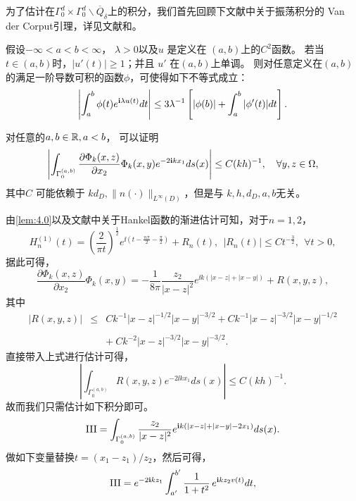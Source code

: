 \finproof
为了估计在$\Gamma_0^d\times \Gamma_0^d\backslash \overline Q_\delta$上的积分，我们首先回顾下文献中关于振荡积分的
Van der Corput引理，详见文献\cite[P.152]{grafakos}和\cite[Lemma 3.2]{ch_ha}。
\begin{lemma}\label{lem:4.2}
假设$-\infty<a<b<\infty$， $\lambda>0$以及$u$ 是定义在 $(a,b)$上的$C^2$函数。 若当 $t\in (a,b)$时，$|u'(t)|\geq 1$；并且
$u'$ 在$(a,b)$上单调。 则对任意定义在$(a,b)$的满足一阶导数可积的函数$\phi$，可使得如下不等式成立：
\begin{equation*}
\left|\int^b_a \phi(t)e^{\mathbf{i}\lambda u(t)}dt\right|\leq 3\lambda^{-1}\left[|\phi(b)|+\int^b_a|\phi'(t)|dt\right].
\end{equation*}
\end{lemma}
\begin{lemma}\label{lem:4.5}
对任意的$a,b\in\mathbb{R}, a<b$， 可以证明
$$
    \left|\int_{\Gamma_0^{(a,b)}} \frac{\partial\Phi_k(x,z)}{\partial x_2} \Phi_k(x,y) e^{-2\mathbf{i} k x_{1}} ds(x)\right|\leq C (kh)^{-1}, \quad \forall y,z \in \Omega,
$$
其中$C$ 可能依赖于 $kd_D, \|n(\cdot)\|_{L^{\infty}(D)}$，但是与 $k, h, d_D,a,b$无关。
\end{lemma}
 \debproof
由\ref{lem:4.0}以及文献\cite[P.197]{watson}中关于Hankel函数的渐进估计可知，对于$n=1,2$，
\begin{equation}\label{Hankel}
  H^{(1)}_n(t)=\left(\frac{2}{\pi t}\right)^{\frac{1}{2}}e^{\ii(t-\frac{n\pi}{2}-\frac{\pi}{2})}+R_n(t),\  \ |R_n(t)|\leq Ct^{-\frac{3}{2}},\  \ \forall t>0,
\end{equation}
据此可得，
$$
	\frac{\partial\Phi_k(x,z)}{\partial x_2} \Phi_k(x,y) = -\frac{1}{8\pi}\frac{z_2}{|x-z|^2} e^{\ii k (|x-z|+|x-y|)} + R(x,y,z),
$$
其中
$$
\begin{array}{lll}
|R(x,y,z)|&\leq&Ck^{-1}|x-z|^{-1/2}|x-y|^{-3/2}+Ck^{-1}|x-z|^{-3/2}|x-y|^{-1/2}\\
& &\\
& &+\ Ck^{-2}|x-z|^{-3/2}|x-y|^{-3/2}.
\end{array}
$$
直接带入上式进行估计可得，
\begin{equation}\label{c0}
\left|\int_{\Gamma_0^{(a,b)}} R(x,y,z) e^{-2\ii k x_{1}} ds(x)\right|\leq C (kh)^{-1}.
\end{equation}
故而我们只需估计如下积分即可。
\begin{equation*}
{\rm III}=\int_{\Gamma_0^{(a,b)}} \frac{z_2}{|x-z|^2} e^{\mathbf{i} k (|x-z|+|x-y|-2x_{1})} ds(x).
\end{equation*}
做如下变量替换$t=(x_{1}-z_1)/z_2$，然后可得，
\begin{equation*}
{\rm III}=e^{-2\mathbf{i} kz_1}\int^{b'}_{a'}\frac{1}{1+t^2}\,e^{\mathbf{i} kz_2v(t)}dt,
\end{equation*}
